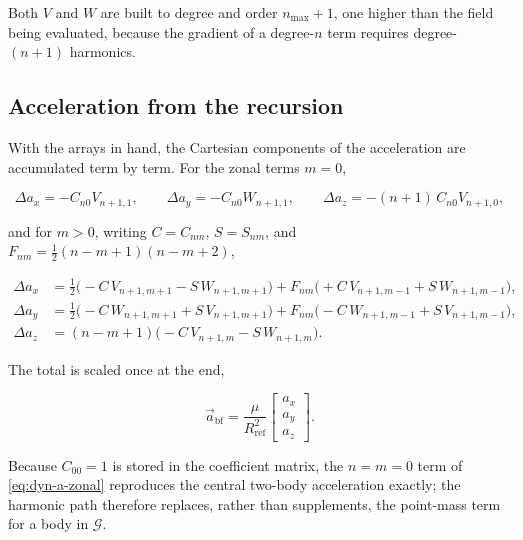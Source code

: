 Both $V$ and $W$ are built to degree and order $n_\mathrm{max}+1$, one higher
than the field being evaluated, because the gradient of a degree-$n$ term
requires degree-$(n+1)$ harmonics.

\subsection{Acceleration from the recursion}

With the arrays in hand, the Cartesian components of the acceleration are
accumulated term by term. For the zonal terms $m=0$,

\begin{equation}
  \label{eq:dyn-a-zonal}
  \Delta a_x = -C_{n0}V_{n+1,1},
  \qquad
  \Delta a_y = -C_{n0}W_{n+1,1},
  \qquad
  \Delta a_z = -(n+1)\,C_{n0}V_{n+1,0},
\end{equation}

and for $m>0$, writing $C=C_{nm}$, $S=S_{nm}$, and
$F_{nm} = \tfrac{1}{2}(n-m+1)(n-m+2)$,

\begin{align}
  \Delta a_x &= \tfrac{1}{2}\bigl(-C\,V_{n+1,m+1} - S\,W_{n+1,m+1}\bigr)
                + F_{nm}\bigl(+C\,V_{n+1,m-1} + S\,W_{n+1,m-1}\bigr), \label{eq:dyn-a-tess-x}\\
  \Delta a_y &= \tfrac{1}{2}\bigl(-C\,W_{n+1,m+1} + S\,V_{n+1,m+1}\bigr)
                + F_{nm}\bigl(-C\,W_{n+1,m-1} + S\,V_{n+1,m-1}\bigr), \label{eq:dyn-a-tess-y}\\
  \Delta a_z &= (n-m+1)\bigl(-C\,V_{n+1,m} - S\,W_{n+1,m}\bigr). \label{eq:dyn-a-tess-z}
\end{align}

The total is scaled once at the end,

\begin{equation}
  \label{eq:dyn-a-scale}
  \vec{a}_\mathrm{bf} = \frac{\mu}{R_\mathrm{ref}^{2}}
  \begin{bmatrix} a_x \\ a_y \\ a_z\end{bmatrix}.
\end{equation}

Because $C_{00}=1$ is stored in the coefficient matrix, the $n=m=0$ term of
\cref{eq:dyn-a-zonal} reproduces the central two-body acceleration exactly; the
harmonic path therefore replaces, rather than supplements, the point-mass term
for a body in $\mathcal{G}$.

